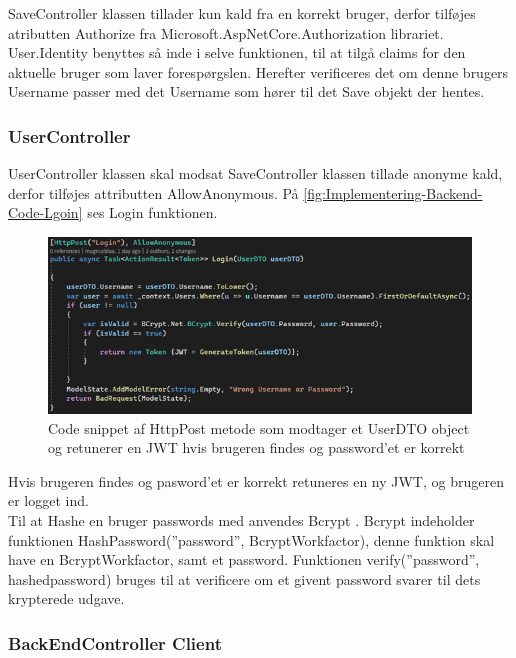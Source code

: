 SaveController klassen tillader kun kald fra en korrekt bruger, derfor tilføjes atributten Authorize fra Microsoft.AspNetCore.Authorization librariet. User.Identity benyttes så inde i selve funktionen, til at tilgå claims for den aktuelle bruger som laver forespørgslen. Herefter verificeres det om denne brugers Username passer med det Username som hører til det Save objekt der hentes.\\  

    

\subsubsection{UserController}

UserController klassen skal modsat SaveController klassen tillade anonyme kald, derfor tilføjes attributten AllowAnonymous. På \autoref{fig:Implementering-Backend-Code-Lgoin} ses Login funktionen.

\begin{figure}[H]
\centering
\includegraphics[width = \textwidth]{02-Body/Images/Backend_Code_Login.PNG}
\caption{Code snippet af HttpPost metode som modtager et UserDTO object og retunerer en JWT hvis brugeren findes og password’et er korrekt}
\label{fig:Implementering-Backend-Code-Lgoin}
\end{figure}


Hvis brugeren findes og pasword'et er korrekt retuneres en ny JWT, og brugeren er logget ind.\\

Til at Hashe en bruger passwords med anvendes Bcrypt \cite{Bcrypt}. Bcrypt indeholder funktionen HashPassword(”password”, BcryptWorkfactor), denne funktion skal have en BcryptWorkfactor, samt et password. Funktionen verify(”password”, hashedpassword) bruges til at verificere om et givent password svarer til dets krypterede udgave.\\


\subsubsection{BackEndController Client}

